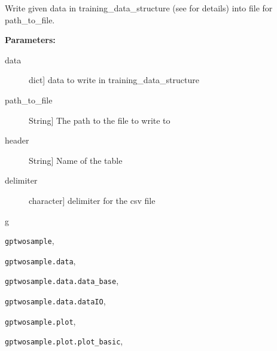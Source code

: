 \documentclass[letterpaper,10pt,english]{sphinxmanual}
\begin{document}

\begin{fulllineitems}
\label{data:gptwosample.data.dataIO.write_data_to_csv}
Write given data in training\_data\_structure (see {\hyperref[data:module-gptwosample.data.data_base]{}} for details)
into file for path\_to\_file.

\textbf{Parameters:}
\begin{description}
\item[{data}] \leavevmode{[}dict{]}
data to write in training\_data\_structure

\item[{path\_to\_file}] \leavevmode{[}String{]}
The path to the file to write to

\item[{header}] \leavevmode{[}String{]}
Name of the table

\item[{delimiter}] \leavevmode{[}character{]}
delimiter for the csv file

\end{description}

\end{fulllineitems}



\renewcommand{\indexname}{Python Module Index}
\begin{theindex}
\def\bigletter#1{{\Large\sffamily#1}\nopagebreak\vspace{1mm}}
\bigletter{g}
\item {\texttt{gptwosample}}, \pageref{base:module-gptwosample}
\item {\texttt{gptwosample.data}}, \pageref{data:module-gptwosample.data}
\item {\texttt{gptwosample.data.data\_base}}, \pageref{data:module-gptwosample.data.data_base}
\item {\texttt{gptwosample.data.dataIO}}, \pageref{data:module-gptwosample.data.dataIO}
\item {\texttt{gptwosample.plot}}, \pageref{plot:module-gptwosample.plot}
\item {\texttt{gptwosample.plot.plot\_basic}}, \pageref{plot:module-gptwosample.plot.plot_basic}
\end{theindex}

\renewcommand{\indexname}{Index}
\printindex
\end{document}
